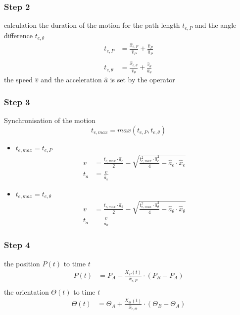 \documentclass[%
  professionalfonts,%
  xcolor={%
    usenames,%
    dvipsnames,%
    svgnames,%
    table,%
    hyperref%
  }%
]{beamer}
\begin{document}
\subsubsection{Step 2}
\begin{frame}
calculation the duration of the motion for the path length $t_{e,P}$ and the angle difference $t_{e,\theta}$
\begin{align*}
t_{e,P} & = \frac{\hat{x}_{e,P}}{\hat{v}_{P}}+\frac{\hat{v}_{P}}{\hat{a}_{P}} \\
\\
t_{e,\theta} & = \frac{\hat{x}_{e,\theta}}{\hat{v}_{\theta}}+\frac{\hat{v}_{\theta}}{\hat{a}_{\theta}}
\end{align*}
the speed $\hat{v}$ and the acceleration $\hat{a}$ is set by the operator
\end{frame}

\subsubsection{Step 3}
\begin{frame}
Synchronisation of the motion
\begin{equation*}
t_{e, max} = max\left(t_{e,P}, t_{e,\theta}\right)
\end{equation*}
\begin{itemize}
\item $t_{e, max} = t_{e,P}$
\begin{align*}
v & = \frac{t_{e,max} \cdot \hat{a}_{e}}{2}-\sqrt{\frac{t_{e,max}^2 \cdot \hat{a}_{e}^2}{4}-\hat{a}_{e}\cdot \hat{x}_{e}} \\
t_{a} & = \frac{v}{\hat{a}_{e}}
\end{align*}
\item $t_{e, max} = t_{e,\theta}$
\begin{align*}
v & = \frac{t_{e,max} \cdot \hat{a}_{\theta}}{2}-\sqrt{\frac{t_{e,max}^2 \cdot \hat{a}_{\theta}^2}{4}-\hat{a}_{\theta}\cdot \hat{x}_{\theta}} \\
t_{a} & = \frac{v }{\hat{a}_{\theta}}
\end{align*}
\end{itemize}
\end{frame}

\subsubsection{Step 4}
\begin{frame}
the position $P(t)$ to time $t$
\begin{align*}
P(t) & = P_{A} + \frac{X_{P}(t)}{\hat{x}_{e,P}} \cdot \left(P_{B} - P_{A} \right)\\
\end{align*}
the orientation $\Theta(t)$ to time $t$
\begin{align*}
\Theta(t) & = \Theta_{A} + \frac{X_{\Theta}(t)}{\hat{x}_{e,\Theta}} \cdot \left(\Theta_{B} - \Theta_{A} \right)\\
\end{align*}
\end{frame}
\end{document}
